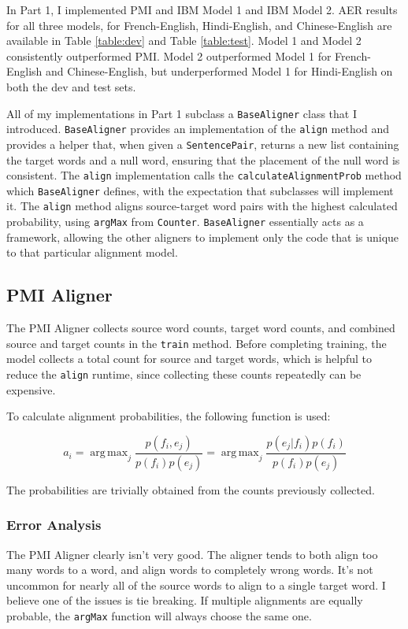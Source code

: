 \documentclass[11pt]{article}
\DeclareMathOperator*{\argmax}{arg\,max}
\begin{document}
In Part 1, I implemented PMI and IBM Model 1 and IBM Model 2.
AER results for all three models, for French-English,
Hindi-English, and Chinese-English are available in Table \ref{table:dev}
and Table \ref{table:test}.  Model 1 and Model 2 consistently outperformed
PMI.  Model 2 outperformed Model 1 for French-English and Chinese-English,
but underperformed Model 1 for Hindi-English on both the dev and test sets.

All of my implementations in Part 1 subclass a \texttt{BaseAligner} 
class that I introduced.  \texttt{BaseAligner} provides an implementation
of the \texttt{align} method and provides a helper that, when given a \texttt{SentencePair},
returns a new list containing the target words and a null word, ensuring that the
placement of the null word is consistent.  The \texttt{align} implementation
calls the \texttt{calculateAlignmentProb} method which \texttt{BaseAligner}
defines, with the expectation that subclasses will implement it.  The \texttt{align}
method aligns source-target word pairs with the highest calculated probability,
using \texttt{argMax} from \texttt{Counter}.
\texttt{BaseAligner}
essentially acts as a framework, allowing the other aligners to implement only
the code that is unique to that particular alignment model.

\subsection{PMI Aligner}

The PMI Aligner collects source word counts, target word counts, and
combined source and target counts in the \texttt{train} method.  Before completing
training, the model collects a total count for source and target words,
which is helpful to reduce the \texttt{align} runtime, since collecting these
counts repeatedly can be expensive.

To calculate alignment probabilities, the following function is used:

$$ a_i = \argmax_{j}\frac{p(f_i, e_j)}{p(f_i)p(e_j)} = \argmax_{j}\frac{p(e_j|f_i)p(f_i)}{p(f_i)p(e_j)} $$

The probabilities are trivially obtained from the counts previously collected.

\subsubsection{Error Analysis}

The PMI Aligner clearly isn't very good.  The aligner tends to both align
too many words to a word, and align words to completely wrong words.  It's not uncommon
for nearly all of the source words to align to a single target word.  I believe
one of the issues is tie breaking.  If multiple alignments are equally probable, the 
\texttt{argMax} function will always choose the same one.  
\end{document}

